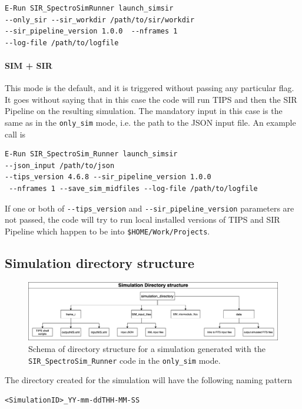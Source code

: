 \begin{verbatim}
E-Run SIR_SpectroSimRunner launch_simsir 
--only_sir --sir_workdir /path/to/sir/workdir
--sir_pipeline_version 1.0.0  --nframes 1
--log-file /path/to/logfile
\end{verbatim}

\paragraph{SIM + SIR}
This mode is the default, and it is triggered without passing any particular flag. It goes without saying that in this case the code will run TIPS and then the SIR Pipeline on the resulting simulation. The mandatory input in this case is the same as in the \verb+only_sim+ mode, i.e. the path to the JSON input file. An example call is

\begin{verbatim}
E-Run SIR_SpectroSim_Runner launch_simsir 
--json_input /path/to/json
--tips_version 4.6.8 --sir_pipeline_version 1.0.0
 --nframes 1 --save_sim_midfiles --log-file /path/to/logfile
\end{verbatim}

If one or both of \verb+--tips_version+ and \verb+--sir_pipeline_version+ parameters are not passed, the code will try to run local installed versions of TIPS and SIR Pipeline which happen to be into \verb+$HOME/Work/Projects+.

\subsection{Simulation directory structure}

\begin{figure}
\centering
\includegraphics[scale=0.325]{figures/TIPS_usage-sir_runner_dir_structure.png}
\caption{Schema of directory structure for a simulation generated with the \texttt{SIR\_SpectroSim\_Runner} code in the \texttt{only\_sim} mode.}
\label{fig:sim_dir_tree}
\end{figure}

The directory created for the simulation will have the following naming pattern

\begin{verbatim}
<SimulationID>_YY-mm-ddTHH-MM-SS
\end{verbatim}

